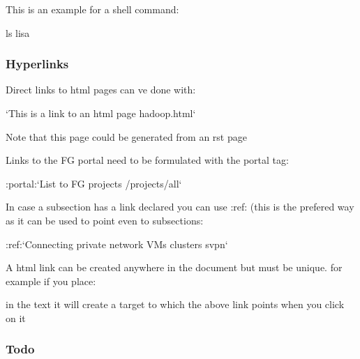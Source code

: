 This is an example for a shell command:

\begin{sphinxVerbatim}[commandchars=\\\{\}]
\PYGZdl{} ls \PYGZhy{}lisa
\end{sphinxVerbatim}


\subsubsection{Hyperlinks}
\label{\detokenize{lesson/doc/rst:hyperlinks}}
Direct links to html pages can ve done with:

\begin{sphinxVerbatim}[commandchars=\\\{\}]
{}`This is a link to an html page \PYGZlt{}hadoop.html\PYGZgt{}{}`\PYGZus{}
\end{sphinxVerbatim}

Note that this page could be generated from an rst page

Links to the FG portal need to be formulated with the portal tag:

\begin{sphinxVerbatim}[commandchars=\\\{\}]
:portal:{}`List to FG projects \PYGZlt{}/projects/all\PYGZgt{}{}`
\end{sphinxVerbatim}

In case a subsection has a link declared you can use :ref: (this is
the prefered way as it can be used to point even to subsections:

\begin{sphinxVerbatim}[commandchars=\\\{\}]
:ref:{}`Connecting private network VMs  clusters \PYGZlt{}\PYGZus{}s\PYGZus{}vpn\PYGZgt{}{}`
\end{sphinxVerbatim}

A html link can be created anywhere in the document but must be
unique. for example if you place:

\begin{sphinxVerbatim}[commandchars=\\\{\}]
 
\end{sphinxVerbatim}

in the text it will create a target to which the above link points
when you click on it


\subsubsection{Todo}
\label{\detokenize{lesson/doc/rst:todo}}
\begin{sphinxVerbatim}[commandchars=\\\{\}]
   
\end{sphinxVerbatim}

